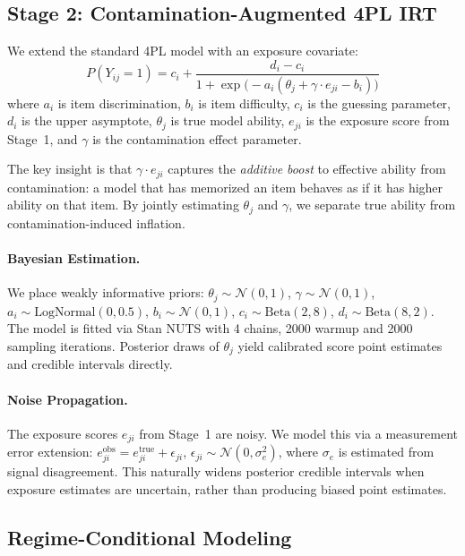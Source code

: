 \documentclass[11pt,letterpaper]{article}
\begin{document}
\subsection{Stage 2: Contamination-Augmented 4PL IRT}

We extend the standard 4PL model with an exposure covariate:
\begin{equation}
P(Y_{ij}=1) = c_i + \frac{d_i - c_i}{1 + \exp\bigl(-a_i(\theta_j + \gamma \cdot e_{ji} - b_i)\bigr)}
\label{eq:4plg}
\end{equation}
where $a_i$ is item discrimination, $b_i$ is item difficulty, $c_i$ is the guessing parameter, $d_i$ is the upper asymptote, $\theta_j$ is true model ability, $e_{ji}$ is the exposure score from Stage~1, and $\gamma$ is the contamination effect parameter.

The key insight is that $\gamma \cdot e_{ji}$ captures the \emph{additive boost} to effective ability from contamination: a model that has memorized an item behaves as if it has higher ability on that item.
By jointly estimating $\theta_j$ and $\gamma$, we separate true ability from contamination-induced inflation.

\paragraph{Bayesian Estimation.}
We place weakly informative priors:
$\theta_j \sim \mathcal{N}(0,1)$,
$\gamma \sim \mathcal{N}(0,1)$,
$a_i \sim \text{LogNormal}(0,0.5)$,
$b_i \sim \mathcal{N}(0,1)$,
$c_i \sim \text{Beta}(2,8)$,
$d_i \sim \text{Beta}(8,2)$.
The model is fitted via Stan NUTS with 4 chains, 2000 warmup and 2000 sampling iterations.
Posterior draws of $\theta_j$ yield calibrated score point estimates and credible intervals directly.

\paragraph{Noise Propagation.}
The exposure scores $e_{ji}$ from Stage~1 are noisy.
We model this via a measurement error extension: $e_{ji}^{\text{obs}} = e_{ji}^{\text{true}} + \epsilon_{ji}$, $\epsilon_{ji} \sim \mathcal{N}(0, \sigma_e^2)$, where $\sigma_e$ is estimated from signal disagreement.
This naturally widens posterior credible intervals when exposure estimates are uncertain, rather than producing biased point estimates.

\subsection{Regime-Conditional Modeling}
\end{document}
